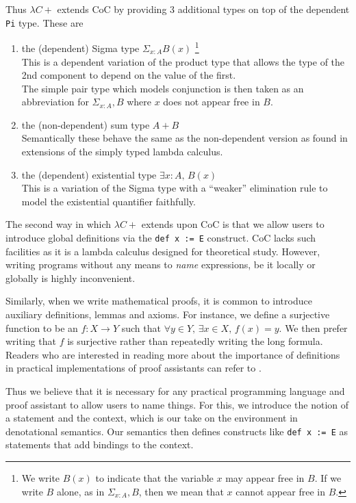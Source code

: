 \documentclass{article}
\begin{document}
Thus $\lambda C+$ extends CoC by providing 3 additional types on top of the
dependent \texttt{Pi} type. These are
\begin{enumerate}
  \item the (dependent) Sigma type $\Sigma_{x : A} B(x)$ 
  \footnote{
    We write $B(x)$ to indicate that the variable $x$ may appear free in $B$.
    If we write $B$ alone, as in $\Sigma_{x : A}, B$, then we mean that $x$
    cannot appear free in $B$.
  }
    \\
    This is a dependent variation of the product type that allows the type 
    of the 2nd component to depend on the value of the first. \\
    The simple pair type which models conjunction is then taken as an
    abbreviation for $\Sigma_{x : A}, B$ where $x$ does not appear free in $B$.

  \item the (non-dependent) sum type $A + B$ \\
    Semantically these behave the same as the non-dependent version as found in
    extensions of the simply typed lambda calculus.
  \item the (dependent) existential type $\exists x : A, \, B(x)$ \\
    This is a variation of the Sigma type with a ``weaker'' elimination rule to
    model the existential quantifier faithfully.
\end{enumerate}

The second way in which $\lambda C+$ extends upon CoC is that we allow users to
introduce global definitions via the \verb|def x := E| construct.
CoC lacks such facilities as it is a lambda calculus designed for theoretical
study.
However, writing programs without any means to \textit{name} expressions, be it
locally or globally is highly inconvenient.

Similarly, when we write mathematical proofs, it is common to introduce
auxiliary definitions, lemmas and axioms.
For instance, we define a surjective function to be an $f : X \to Y$ such that
$\forall y \in Y, \, \exists x \in X, \, f(x) = y$. We then prefer writing that
$f$ is surjective rather than repeatedly writing the long formula.
Readers who are interested in reading more about the importance of
definitions in practical implementations of proof assistants can refer to
\cite{type_theory_and_formal_proof}.

Thus we believe that it is necessary for any practical programming language and
proof assistant to allow users to name things.
For this, we introduce the notion of a statement and the context, which is our take
on the environment in denotational semantics.
Our semantics then defines constructs like \verb|def x := E| as statements that
add bindings to the context.
\end{document}

